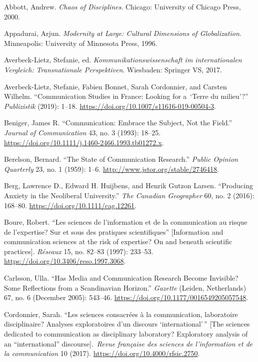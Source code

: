 \documentclass{tufte-handout}
\begin{document}
\begin{hangparas}{.25in}{1} 



Abbott, Andrew. \emph{Chaos of Disciplines}. Chicago: University of
Chicago Press, 2000.

Appadurai, Arjun. \emph{Modernity at Large: Cultural Dimensions of
Globalization}. Minneapolis: University of Minnesota Press, 1996.

Averbeck-Lietz, Stefanie, ed. \emph{Kommunikationswissenschaft im
internationalen Vergleich: Transnationale Perspektiven}. Wiesbaden:
Springer VS, 2017.

Averbeck-Lietz, Stefanie, Fabien Bonnet, Sarah Cordonnier, and Carsten
Wilhelm. ``Communication Studies in France: Looking for a~`Terre du
milieu'?'' \emph{Publizistik} (2019): 1--18.
\url{https://doi.org/10.1007/s11616-019-00504-3}.

Beniger, James R. ``Communication: Embrace the Subject, Not the Field.''
\emph{Journal of Communication} 43, no. 3 (1993): 18--25.
\url{https://doi.org/10.1111/j.1460-2466.1993.tb01272.x}.

Berelson, Bernard. ``The State of Communication Research.'' \emph{Public
Opinion Quarterly} 23, no. 1 (1959): 1--6.
\url{http://www.jstor.org/stable/2746418}.

Berg, Lawrence D., Edward H. Huijbens, and Henrik Gutzon Larsen.
``Producing Anxiety in the Neoliberal University.'' \emph{The Canadian
Geographer} 60, no. 2 (2016): 168--80.
\url{https://doi.org/10.1111/cag.12261}.

Boure, Robert. ``Les sciences de l'information et de la communication au
risque de l'expertise? Sur et sous des pratiques scientifiques''
{[}Information and communication sciences at the risk of expertise? On
and beneath scientific practices{]}. \emph{Réseaux} 15, no. 82--83
(1997): 233--53. \url{https://doi.org/10.3406/reso.1997.3068}.

Carlsson, Ulla. ``Has Media and Communication Research Become Invisible?
Some Reflections from a Scandinavian Horizon.'' \emph{Gazette} (Leiden,
Netherlands) 67, no. 6 (December 2005): 543--46.
\url{https://doi.org/10.1177/0016549205057548}.

Cordonnier, Sarah. ``Les sciences consacrées à la communication,
laboratoire disciplinaire? Analyses exploratoires d'un discours
`international'\,'' {[}The sciences dedicated to communication as
disciplinary laboratory? Exploratory analysis of an ``international''
discourse{]}.~\emph{Revue française des sciences de l'information et de
la communication} 10 (2017). \url{https://doi.org/10.4000/rfsic.2750}.


\end{hangparas}
\end{document}
